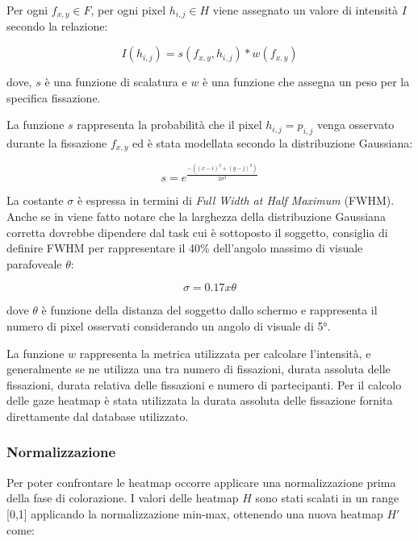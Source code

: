 Per ogni $f_{x,y} \in F$, per ogni pixel $h_{i,j} \in H$ viene assegnato un valore di intensità $I$ secondo la relazione:

\begin{equation}
  I(h_{i,j}) = s(f_{x,y} ,h_{i,j}) * w(f_{x,y})
  \label{eq:heatmap_intensity}
\end{equation}

dove, $s$ è una funzione di scalatura e $w$ è una funzione che assegna un peso per la specifica fissazione.

La funzione $s$ rappresenta la probabilità che il pixel $h_{i,j} = p_{i,j}$ venga osservato durante la fissazione $f_{x,y}$ ed è stata modellata secondo la distribuzione Gaussiana:

\begin{equation}
  s = e^{\frac{-((x-i)^2+(y-j)^2)}{2\sigma^{2}}}
\end{equation}

La costante $\sigma$ è espressa in termini di \textit{Full Width at Half Maximum} (FWHM). Anche se in \cite{wooding2002eye} viene fatto notare che la larghezza della distribuzione Gaussiana corretta dovrebbe dipendere dal task cui è sottoposto il soggetto, \cite{blignaut2010visual} consiglia di definire FWHM per rappresentare il 40\% dell'angolo massimo di visuale parafoveale $\theta$:

\begin{equation}
  \sigma = 0.17 x \theta
\end{equation}

dove $\theta$ è funzione della distanza del soggetto dallo schermo e rappresenta il numero di pixel osservati considerando un angolo di visuale di 5°.

La funzione $w$ rappresenta la metrica utilizzata per calcolare l'intensità, e generalmente se ne utilizza una tra numero di fissazioni, durata assoluta delle fissazioni, durata relativa delle fissazioni e numero di partecipanti. Per il calcolo delle gaze heatmap è stata utilizzata la durata assoluta delle fissazione fornita direttamente dal database utilizzato.

\subsubsection*{Normalizzazione}
Per poter confrontare le heatmap occorre applicare una normalizzazione prima della fase di colorazione. I valori delle heatmap $H$ sono stati scalati in un range [0,1] applicando la normalizzazione min-max, ottenendo una nuova heatmap $H'$ come:

